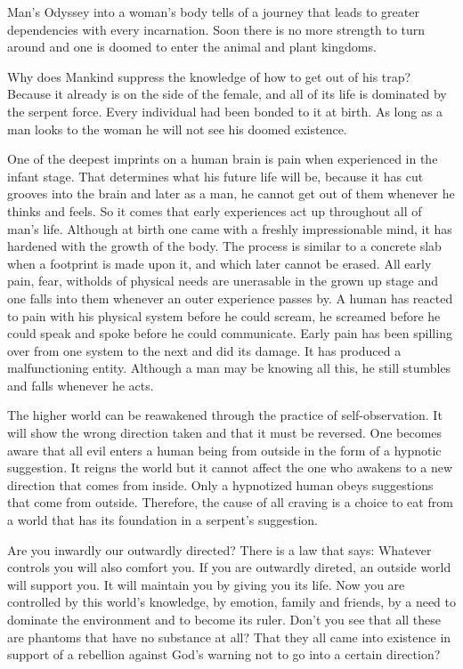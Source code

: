 \documentclass[12pt,letterpaper]{article}
\begin{document}
Man's Odyssey into a woman's body tells of a journey that leads to
greater dependencies with every incarnation. Soon there is no more
strength to turn around and one is doomed to enter the animal and
plant kingdoms.

Why does Mankind suppress the knowledge of how to get out of his trap? 
Because it already is on the side of the female, and all of its life
is dominated by the serpent force. Every individual had been bonded to
it at birth. As long as a man looks to the woman he will not see his
doomed existence.

One of the deepest imprints on a human brain is pain when experienced
in the infant stage. That determines what his future life will be,
because it has cut grooves into the brain and later as a man, he
cannot get out of them whenever he thinks and feels. So it comes that
early experiences act up throughout all of man's life. Although at
birth one came with a freshly impressionable mind, it has hardened
with the growth of the body. The process is similar to a concrete slab
when a footprint is made upon it, and which later cannot be
erased. All early pain, fear, witholds of physical needs are
unerasable in the grown up stage and one falls into them whenever an
outer experience passes by.  A human has reacted to pain with his
physical system before he could scream, he screamed before he could
speak and spoke before he could communicate. Early pain has been
spilling over from one system to the next and did its damage. It has
produced a malfunctioning entity. Although a man may be knowing all
this, he still stumbles and falls whenever he acts.

The higher world can be reawakened through the practice of
self-observation.  It will show the wrong direction taken and that it
must be reversed. One becomes aware that all evil enters a human being
from outside in the form of a hypnotic suggestion. It reigns the world
but it cannot affect the one who awakens to a new direction that comes
from inside. Only a hypnotized human obeys suggestions that come from
outside. Therefore, the cause of all craving is a choice to eat from a
world that has its foundation in a serpent's suggestion.

Are you inwardly our outwardly directed? There is a law that says:
Whatever controls you will also comfort you. If you are outwardly
direted, an outside world will support you. It will maintain you by
giving you its life. Now you are controlled by this world's knowledge,
by emotion, family and friends, by a need to dominate the environment
and to become its ruler. Don't you see that all these are phantoms
that have no substance at all? That they all came into existence in
support of a rebellion against God's warning not to go into a certain
direction?
\end{document}

